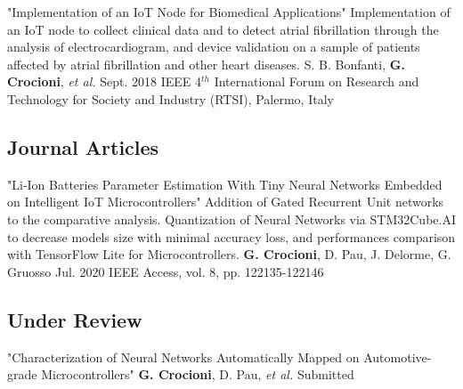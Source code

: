 \documentclass[doublesided,
                paper=a4,
               fontsize=10pt
              ]{my_resume}
\begin{document}
{    \vspace{8pt}
    {\color{highlightbarcolor}{\rule{\linewidth}{1.0pt}}}
    
    \publication
    	{"Implementation of an IoT Node for Biomedical Applications"} %
    	{Implementation of an IoT node to collect clinical data and to detect atrial fibrillation through the analysis of electrocardiogram, and device validation on a sample of patients affected by atrial fibrillation and other heart diseases.}
    	{S. B. Bonfanti, \textbf{G. Crocioni}, \textit{et al.}} %
    	{Sept. 2018} %
    	{IEEE 4${^{th}}$ International Forum on Research and Technology for Society and Industry (RTSI), Palermo, Italy} %

    \vspace{8pt}

    \medskip
    
    \textcolor{happycolor}\faFileTextO\hspace{2mm}\subsection{Journal Articles}
    \vspace{-8pt}
    
    
    \publication
    	{"Li-Ion Batteries Parameter Estimation With Tiny Neural Networks Embedded on Intelligent IoT Microcontrollers"} %
    	{Addition of Gated Recurrent Unit networks to the comparative analysis. Quantization of Neural Networks via STM32Cube.AI to decrease models size with minimal accuracy loss, and performances comparison with TensorFlow Lite for Microcontrollers.}
    	{\textbf{G. Crocioni}, D. Pau, J. Delorme, G. Gruosso} %
    	{Jul. 2020} %
    	{IEEE Access, vol. 8, pp. 122135-122146} %

    \medskip
    \medskip
    
    \textcolor{happycolor}\faSpinner\hspace{2mm}\subsection{Under Review}
    \vspace{-8pt}


    \publication
    	{"Characterization of Neural Networks Automatically Mapped on Automotive-grade Microcontrollers"} %
    	{}
    	{\textbf{G. Crocioni}, D. Pau, \textit{et al.}} %
    	{Submitted} %
    	{}
    	
}

\makebody
\clearpage
\end{document}
